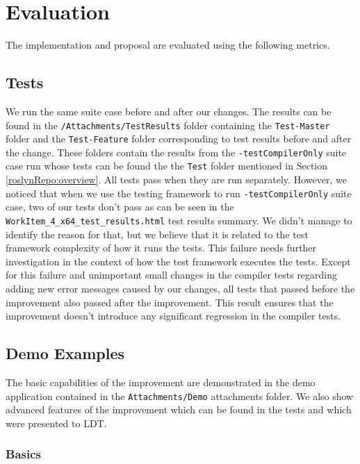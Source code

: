 \chapter{Evaluation}

The implementation and proposal are evaluated using the following metrics.

\section{Tests}

We run the same suite case before and after our changes. 
The results can be found in the \texttt{/Attachments/TestResults} folder containing the \texttt{Test-Master} folder and the \texttt{Test-Feature} folder corresponding to test results before and after the change. 
These folders contain the results from the \texttt{-testCompilerOnly} suite case run whose tests can be found the the \texttt{Test} folder mentioned in Section \ref{roslynRepo:overview}.
All tests pass when they are run separately.
However, we noticed that when we use the testing framework to run \texttt{-testCompilerOnly} suite case, two of our tests don't pass as can be seen in the \texttt{WorkItem\_4\_x64\_test\_results.html} test results summary.
We didn't manage to identify the reason for that, but we believe that it is related to the test framework complexity of how it runs the tests.
This failure needs further investigation in the context of how the test framework executes the tests.
Except for this failure and unimportant small changes in the compiler tests regarding adding new error messages caused by our changes, all tests that passed before the improvement also passed after the improvement.
This result ensures that the improvement doesn’t introduce any significant regression in the compiler tests.

\section{Demo Examples}

The basic capabilities of the improvement are demonstrated in the demo application contained in the \texttt{Attachments/Demo} attachments folder. 
We also show advanced features of the improvement which can be found in the tests and which were presented to LDT. 


\subsection{Basics}

